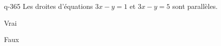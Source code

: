 \begin{truefalse}{q-365}
Les droites d'équations $3x-y=1$ et $3x-y=5$ sont parallèles.
\item* Vrai
\item Faux
\end{truefalse}

